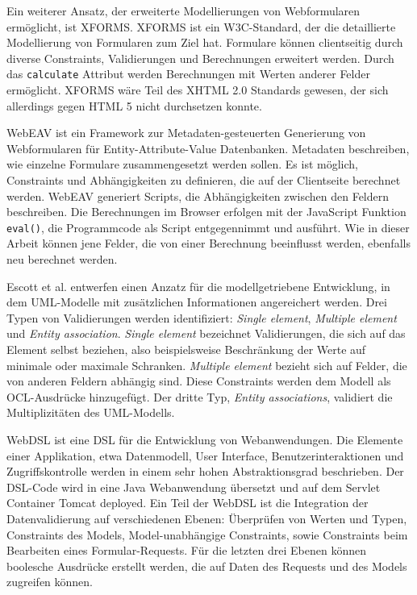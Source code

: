 Ein weiterer Ansatz, der erweiterte Modellierungen von Webformularen ermöglicht, ist XFORMS. XFORMS ist ein W3C-Standard\cite{Xfor09}, der die detaillierte Modellierung von Formularen zum Ziel hat. Formulare können clientseitig durch diverse Constraints, Validierungen und Berechnungen erweitert werden. Durch das \texttt{calculate} Attribut werden Berechnungen mit Werten anderer Felder ermöglicht\cite{Chas07}. XFORMS wäre Teil des XHTML 2.0 Standards gewesen, der sich allerdings gegen HTML 5 nicht durchsetzen konnte.

WebEAV\cite{NaPr00} ist ein Framework zur Metadaten-gesteuerten Generierung von Webformularen für Entity-Attribute-Value Datenbanken. Metadaten beschreiben, wie einzelne Formulare zusammengesetzt werden sollen. Es ist möglich, Constraints und Abhängigkeiten zu definieren, die auf der Clientseite berechnet werden. WebEAV generiert Scripts, die Abhängigkeiten zwischen den Feldern beschreiben. Die Berechnungen im Browser erfolgen mit der JavaScript Funktion \texttt{eval()}, die Programmcode als Script entgegennimmt und ausführt. Wie in dieser Arbeit können jene Felder, die von einer Berechnung beeinflusst werden, ebenfalls neu berechnet werden.

Escott et al.\cite{Esco12} entwerfen einen Anzatz für die modellgetriebene Entwicklung, in dem UML-Modelle mit zusätzlichen Informationen angereichert werden. Drei Typen von Validierungen werden identifiziert: \emph{Single element}, \emph{Multiple element} und \emph{Entity association}. \emph{Single element} bezeichnet Validierungen, die sich auf das Element selbst beziehen, also beispielsweise Beschränkung der Werte auf minimale oder maximale Schranken. \emph{Multiple element} bezieht sich auf Felder, die von anderen Feldern abhängig sind. Diese Constraints werden dem Modell als OCL-Ausdrücke hinzugefügt. Der dritte Typ, \emph{Entity associations}, validiert die Multiplizitäten des UML-Modells.

WebDSL\cite{Vis08} ist eine DSL für die Entwicklung von Webanwendungen. Die Elemente einer Applikation, etwa Datenmodell, User Interface, Benutzerinteraktionen und Zugriffskontrolle werden in einem sehr hohen Abstraktionsgrad beschrieben. Der DSL-Code wird in eine Java Webanwendung übersetzt und auf dem Servlet Container Tomcat deployed. Ein Teil der WebDSL ist die Integration der Datenvalidierung\cite{GrVi09} auf verschiedenen Ebenen: Überprüfen von Werten und Typen, Constraints des Models, Model-unabhängige Constraints, sowie Constraints beim Bearbeiten eines Formular-Requests. Für die letzten drei Ebenen können boolesche Ausdrücke erstellt werden, die auf Daten des Requests und des Models zugreifen können.



